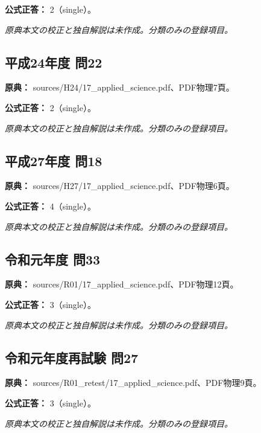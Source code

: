 \textbf{公式正答：} 2（single）。

\par\textit{原典本文の校正と独自解説は未作成。分類のみの登録項目。}

\subsection{平成24年度 問22}
\label{q:h24-reg-applied-22}

\noindent\textbf{原典：} sources/H24/17\_applied\_science.pdf、PDF物理7頁。

\textbf{公式正答：} 2（single）。

\par\textit{原典本文の校正と独自解説は未作成。分類のみの登録項目。}

\subsection{平成27年度 問18}
\label{q:h27-reg-applied-18}

\noindent\textbf{原典：} sources/H27/17\_applied\_science.pdf、PDF物理6頁。

\textbf{公式正答：} 4（single）。

\par\textit{原典本文の校正と独自解説は未作成。分類のみの登録項目。}

\subsection{令和元年度 問33}
\label{q:r01-reg-applied-33}

\noindent\textbf{原典：} sources/R01/17\_applied\_science.pdf、PDF物理12頁。

\textbf{公式正答：} 3（single）。

\par\textit{原典本文の校正と独自解説は未作成。分類のみの登録項目。}

\subsection{令和元年度再試験 問27}
\label{q:r01-ret-applied-27}

\noindent\textbf{原典：} sources/R01\_retest/17\_applied\_science.pdf、PDF物理9頁。

\textbf{公式正答：} 3（single）。

\par\textit{原典本文の校正と独自解説は未作成。分類のみの登録項目。}

